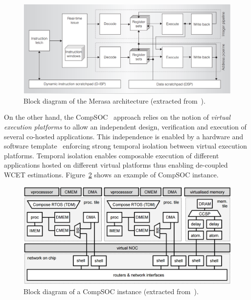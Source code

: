 \documentclass[main.tex]{subfiles}
\begin{document}
\begin{figure}
    \centering
    \includegraphics[width=13cm]{imgs/png/stateOfTheArt_MERASAarchi.png}
    \caption{Block diagram of the Merasa architecture (extracted from~\cite{Merasa}).}
    \label{fig_stateOfTheArt_MERASAarchi}
\end{figure}


On the other hand, the CompSOC~\cite{Goossens2013} approach relies on the notion of \emph{virtual execution platforms} to allow an independent design, verification and execution of several co-hosted applications. This independence is enabled by a hardware and software template~\cite{Hansson2009} enforcing strong temporal isolation between virtual execution platforms. Temporal isolation enables composable execution of different applications hosted on different virtual platforms thus enabling de-coupled WCET estimations. Figure~\ref{fig_stateOfTheArt_COMPSOCarchi} shows an example of CompSOC instance. \\

\begin{figure}
    \centering
    \includegraphics[width=13cm]{imgs/png/stateOfTheArt_COMPSOCarchi.png}
    \caption{Block diagram of a CompSOC instance (extracted from~\cite{Goossens2013}).}
    \label{fig_stateOfTheArt_COMPSOCarchi}
\end{figure}
\end{document}
